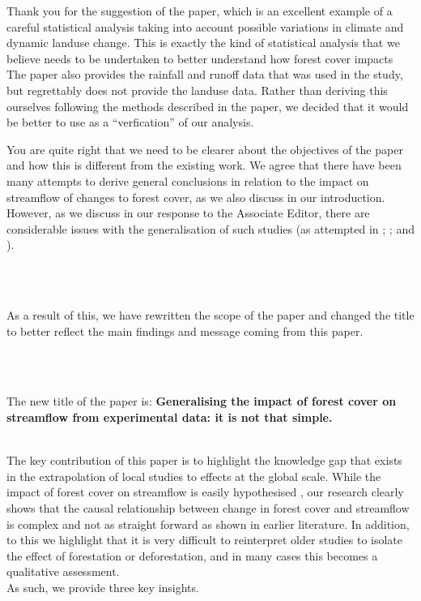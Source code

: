 \documentclass[]{elsarticle} %
\begin{document}
Thank you for the suggestion of the \citet{levy2018} paper, which is an excellent example of a careful statistical analysis taking into account possible variations in climate and dynamic landuse change. This is exactly the kind of statistical analysis that we believe needs to be undertaken to better understand how forest cover impacts The paper also provides the rainfall and runoff data that was used in the study, but regrettably does not provide the landuse data. Rather than deriving this ourselves following the methods described in the paper, we decided that it would be better to use \citet{levy2018} as a ``verfication'' of our analysis.

You are quite right that we need to be clearer about the objectives of the paper and how this is different from the existing work. We agree that there have been many attempts to derive general conclusions in relation to the impact on streamflow of changes to forest cover, as we also discuss in our introduction. However, as we discuss in our response to the Associate Editor, there are considerable issues with the generalisation of such studies (as attempted in \citet{zhou2015}; \citet{jackson2005}; \citet{filoso2017} and \citet{zhang2017}).\\
\strut \\
\strut \\
As a result of this, we have rewritten the scope of the paper and changed the title to better reflect the main findings and message coming from this paper.\\
\strut \\
\strut \\
The new title of the paper is:
\textbf{Generalising the impact of forest cover on streamflow from experimental data: it is not that simple.}\\
\strut \\
The key contribution of this paper is to highlight the knowledge gap that exists in the extrapolation of local studies to effects at the global scale. While the impact of forest cover on streamflow is easily hypothesised \citep[e.g.][]{zhou2015, hoekvandijke2022}, our research clearly shows that the causal relationship between change in forest cover and streamflow is complex and not as straight forward as shown in earlier literature. In addition, to this we highlight that it is very difficult to reinterpret older studies to isolate the effect of forestation or deforestation, and in many cases this becomes a qualitative assessment.\\
As such, we provide three key insights.
\end{document}
